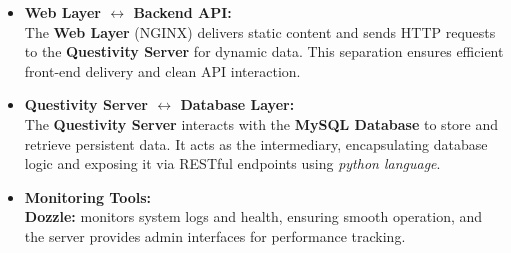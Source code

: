 \documentclass[12pt]{article}
\begin{document}
\begin{itemize}
    \item \textbf{Web Layer $\leftrightarrow$ Backend API:}\\
    The \textbf{Web Layer} (NGINX) delivers static content and sends HTTP requests to the \textbf{Questivity Server} for dynamic data. This separation ensures efficient front-end delivery and clean API interaction.

    \item \textbf{Questivity Server $\leftrightarrow$ Database Layer:}\\
    The \textbf{Questivity Server} interacts with the \textbf{MySQL Database} to store and retrieve persistent data. It acts as the intermediary, encapsulating database logic and exposing it via RESTful endpoints using \textit{python language}.

    \item \textbf{Monitoring Tools:}\\
    \textbf{Dozzle:} monitors system logs and health, ensuring smooth operation, and the server provides admin interfaces for performance tracking.
\end{itemize}
\end{document}
